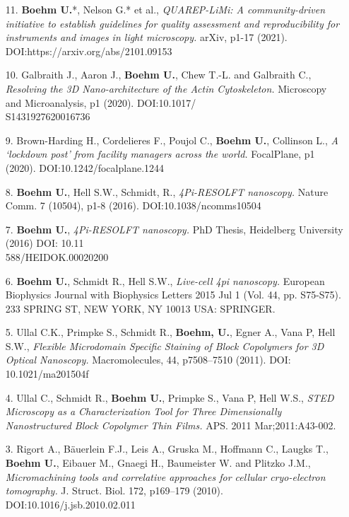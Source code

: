 \documentclass[margin,line]{res}
\begin{document}
\begin{resume}
\begin{enumerate}[leftmargin=*]
\item[11.] {\bf Boehm U.}*, Nelson G.* et al., {\it QUAREP-LiMi: A community-driven initiative to establish guidelines for quality assessment and reproducibility for instruments and images in light microscopy.} arXiv, p1-17 (2021). DOI:https://arxiv.org/abs/2101.09153

\item[10.] Galbraith J., Aaron J., {\bf Boehm U.}, Chew T.-L. and Galbraith C., {\it Resolving the 3D Nano-architecture of the Actin Cytoskeleton.} Microscopy and Microanalysis, p1 (2020). DOI:10.1017/\\S1431927620016736

\item[9.] Brown-Harding H., Cordelieres F., Poujol C., {\bf Boehm U.}, Collinson L., {\it A ‘lockdown post’ from facility managers across the world.} FocalPlane, p1 (2020). DOI:10.1242/focalplane.1244

\item[8.]  {\bf Boehm U.}, Hell S.W., Schmidt, R., {\it 4Pi-RESOLFT nanoscopy.} Nature Comm. 7 (10504), p1-8 (2016). DOI:10.1038/ncomms10504

\item[7.] {\bf Boehm U.},  {\it 4Pi-RESOLFT nanoscopy.} PhD Thesis, Heidelberg University (2016) DOI: 10.11\\588/HEIDOK.00020200

\item[6.] {\bf Boehm U.}, Schmidt R., Hell S.W., {\it Live-cell 4pi nanoscopy.} European Biophysics Journal with Biophysics Letters 2015 Jul 1 (Vol. 44, pp. S75-S75). 233 SPRING ST, NEW YORK, NY 10013 USA: SPRINGER.

\item[5.] Ullal C.K., Primpke S., Schmidt R., {\bf Boehm, U.}, Egner A., Vana P, Hell S.W., {\it Flexible Microdomain Specific Staining of Block Copolymers for 3D Optical Nanoscopy.} Macromolecules, 44, p7508–7510 (2011). DOI: 10.1021/ma201504f

\item[4.] Ullal C., Schmidt R., {\bf  Boehm U.}, Primpke S., Vana P, Hell W.S.,  {\it STED Microscopy as a Characterization Tool for Three Dimensionally Nanostructured Block Copolymer Thin Films.} APS. 2011 Mar;2011:A43-002.

\item[3.] Rigort A., Bäuerlein F.J., Leis A., Gruska M., Hoffmann C., Laugks T., {\bf Boehm U.}, Eibauer M., Gnaegi H., Baumeister W. and Plitzko J.M.,  {\it Micromachining tools and correlative approaches for cellular cryo-electron tomography.} J. Struct. Biol. 172, p169–179 (2010). \\DOI:10.1016/j.jsb.2010.02.011


\end{enumerate}
\end{resume}
\end{document}
